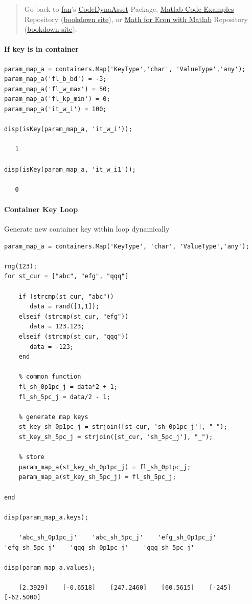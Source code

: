 \documentclass[
]{book}
\begin{document}
\begin{quote}
Go back to \href{http://fanwangecon.github.io/}{fan}'s \href{https://fanwangecon.github.io/CodeDynaAsset/}{CodeDynaAsset} Package, \href{https://fanwangecon.github.io/M4Econ/}{Matlab Code Examples} Repository (\href{https://fanwangecon.github.io/M4Econ/bookdown}{bookdown site}), or \href{https://fanwangecon.github.io/Math4Econ/}{Math for Econ with Matlab} Repository (\href{https://fanwangecon.github.io/Math4Econ/bookdown}{bookdown site}).
\end{quote}

\hypertarget{if-key-is-in-container}{%
\paragraph{If key is in container}\label{if-key-is-in-container}}

\begin{verbatim}
param_map_a = containers.Map('KeyType','char', 'ValueType','any');
param_map_a('fl_b_bd') = -3;
param_map_a('fl_w_max') = 50;
param_map_a('fl_kp_min') = 0;
param_map_a('it_w_i') = 100;

disp(isKey(param_map_a, 'it_w_i'));

   1

disp(isKey(param_map_a, 'it_w_i1'));

   0
\end{verbatim}

\hypertarget{container-key-loop}{%
\paragraph{Container Key Loop}\label{container-key-loop}}

Generate new container key within loop dynamically

\begin{verbatim}
param_map_a = containers.Map('KeyType', 'char', 'ValueType','any');

rng(123);
for st_cur = ["abc", "efg", "qqq"]

    if (strcmp(st_cur, "abc"))
       data = rand([1,1]);
    elseif (strcmp(st_cur, "efg"))
       data = 123.123;
    elseif (strcmp(st_cur, "qqq"))
       data = -123;
    end

    % common function
    fl_sh_0p1pc_j = data*2 + 1;
    fl_sh_5pc_j = data/2 - 1;

    % generate map keys
    st_key_sh_0p1pc_j = strjoin([st_cur, 'sh_0p1pc_j'], "_");
    st_key_sh_5pc_j = strjoin([st_cur, 'sh_5pc_j'], "_");

    % store
    param_map_a(st_key_sh_0p1pc_j) = fl_sh_0p1pc_j;
    param_map_a(st_key_sh_5pc_j) = fl_sh_5pc_j;

end

disp(param_map_a.keys);

    'abc_sh_0p1pc_j'    'abc_sh_5pc_j'    'efg_sh_0p1pc_j'    'efg_sh_5pc_j'    'qqq_sh_0p1pc_j'    'qqq_sh_5pc_j'

disp(param_map_a.values);

    [2.3929]    [-0.6518]    [247.2460]    [60.5615]    [-245]    [-62.5000]
\end{verbatim}
\end{document}
